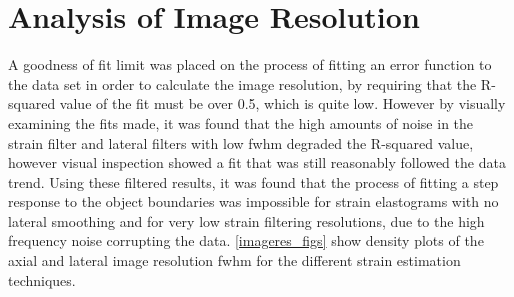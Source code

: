 \section{Analysis of Image Resolution} \label{image_res_results}

A goodness of fit limit was placed on the process of fitting an error function to the data set in order to calculate the image resolution, by requiring that the R-squared value of the fit must be over 0.5, which is quite low. However by visually examining the fits made, it was found that the high amounts of noise in the strain filter and lateral filters with low \ac{fwhm} degraded the R-squared value, however visual inspection showed a fit that was still reasonably followed the data trend. Using these filtered results, it was found that the process of fitting a step response to the object boundaries was impossible for strain elastograms with no lateral smoothing and for very low strain filtering resolutions, due to the high frequency noise corrupting the data. \autoref{imageres_figs} show density plots of the axial and lateral image resolution \ac{fwhm} for the different strain estimation techniques.

